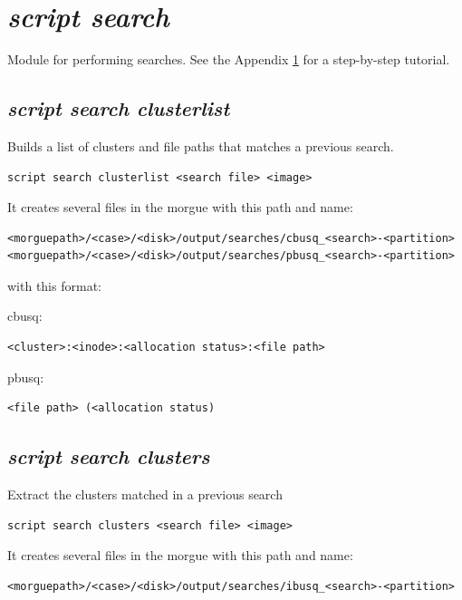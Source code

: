 \documentclass[a4paper,11pt,oneside]{report}
\begin{document}
\section{\emph{script search}} \label{anx:searches}

Module for performing searches. See the Appendix \ref{anx:searches} for a step-by-step tutorial.


\subsection{\emph{script search clusterlist}}

Builds a list of clusters and file paths that matches a previous search.

\begin{verbatim}
script search clusterlist <search file> <image>
\end{verbatim}

It creates several files in the morgue with this path and name:

\begin{verbatim}
<morguepath>/<case>/<disk>/output/searches/cbusq_<search>-<partition>
<morguepath>/<case>/<disk>/output/searches/pbusq_<search>-<partition>
\end{verbatim}

with this format:

cbusq:
\begin{verbatim}
<cluster>:<inode>:<allocation status>:<file path>
\end{verbatim}

pbusq:
\begin{verbatim}
<file path> (<allocation status)
\end{verbatim}



\subsection{\emph{script search clusters}}

Extract the clusters matched in a previous search

\begin{verbatim}
script search clusters <search file> <image>
\end{verbatim}

It creates several files in the morgue with this path and name:

\begin{verbatim}
<morguepath>/<case>/<disk>/output/searches/ibusq_<search>-<partition>
\end{verbatim}
\end{document}
